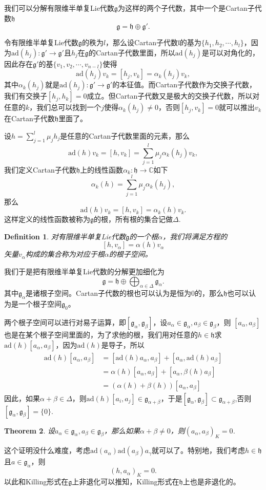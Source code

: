 \documentclass[8pt]{book}
\theoremstyle{plain}
\newtheorem{defi}{Definition}
\newtheorem{theo}[defi]{Theorem}
\newcommand{\cc}{\mathbb{C}}
\newcommand{\lag}{{\mathfrak{g}}}  %
\newcommand{\ad}{{\mathrm{ad}}}
\begin{document}
我们可以分解有限维半单复Lie代数$\lag$为这样的两个子代数，其中一个是Cartan子代数$\mathfrak{h}$
\[
	\lag=\mathfrak{h}\oplus \lag'.
\]

令有限维半单复Lie代数$\lag$的秩为$l$，那么设Cartan子代数$\mathfrak{l}$的基为$\{h_1,h_2,\cdots,h_l\}$，因为$\ad(h_j):\lag'\to \lag'$且$h_j$在$\lag$的Cartan子代数里面，所以$\ad(h_j)$是可以对角化的，因此存在$\lag'$的基$\{v_1,v_2,\cdots,v_{n-l}\}$使得
\[
	\ad(h_j)v_k=[h_j,v_k]=\alpha_{k}(h_j)v_k,
\]
其中$\alpha_{k}(h_j)$就是$\ad(h_j):\lag'\to \lag'$的本征值。而Cartan子代数作为交换子代数，我们有交换子$[h_j,h_k]=0$成立。但Cartan子代数又是极大的交换子代数，所以对任意的$k$，我们总可以找到一个$j$使得$\alpha_{k}(h_j)\neq 0$，否则$[h_j,v_k]=0$就可以推出$v_k$在Cartan子代数$\mathfrak{h}$里面了。

设$h=\sum_{j=1}^l\mu_jh_j$是任意的Cartan子代数里面的元素，那么
\[
	\ad(h)v_k=[h,v_k]=\sum_{j=1}^l\mu_j\alpha_{k}(h_j)v_k,
\]
我们定义Cartan子代数$\mathfrak{h}$上的线性函数$\alpha_{k}:\mathfrak{h}\to\cc$如下
\[
\alpha_{k}(h)=\sum_{j=1}^l\mu_j\alpha_{k}(h_j),
\]
那么
\[
	\ad(h)v_k=[h,v_k]=\alpha_{k}(h)v_k.
\]
这样定义的线性函数被称为$\lag$的根，所有根的集合记做$\Delta$.
\begin{defi}
对有限维半单复Lie代数$\lag$的一个根$\alpha$，我们将满足方程的
\[
[h,v_\alpha]=\alpha(h)v_\alpha
\]
矢量$v_\alpha$构成的集合称为对应于根$\alpha$的根子空间。
\end{defi}
我们于是把有限维半单复Lie代数的分解更加细化为
\[
	\lag=\mathfrak{h}\oplus \bigoplus_{\alpha\in\Delta} \lag_\alpha.
\]
其中$\lag_\alpha$是诸根子空间。Cartan子代数的根也可以认为是恒为0的，那么$\mathfrak{h}$也可以认为是一个根子空间$\lag_0$。

两个根子空间可以进行对易子运算，即$[\lag_\alpha,\lag_\beta]$，设$a_\alpha\in\lag_\alpha,a_\beta\in\lag_\beta$，则
$[a_\alpha,a_\beta]$也是在某个根子空间里面的，为了求他的根，我们用对任意的$h\in \mathfrak{h}$求$\ad(h)[a_\alpha,a_\beta]$，因为$\ad(h)$是导子，所以
\[
	\begin{split}
		\ad(h)[a_\alpha,a_\beta]&=[\ad(h)a_\alpha,a_\beta]+[a_\alpha,\ad(h)a_\beta]\\
		&=\alpha(h)[a_\alpha,a_\beta]+[a_\alpha,\beta(h)a_\beta]\\
		&=(\alpha(h)+\beta(h))[a_\alpha,a_\beta]
	\end{split}
\]
因此，如果$\alpha+\beta\in\Delta$，则$\ad(h)[a_i,a_j]\in \lag_{\alpha+\beta}$，于是$[\lag_\alpha,\lag_\beta]\subset \lag_{\alpha+\beta}$,否则$[\lag_\alpha,\lag_\beta]=\{0\}$.

\begin{theo}
设$a_\alpha\in\lag_\alpha,a_\beta\in\lag_\beta$，那么如果$\alpha+\beta\neq 0$，则$(a_\alpha,a_\beta)_K=0$.
\end{theo}
这个证明没什么难度，考虑$\ad(a_\alpha) \ad(a_\beta) a_\gamma$就可以了。特别地，我们考虑$h\in \mathfrak{h}$且$a\in \lag_\alpha$，则
\[
	(h,a_\alpha)_K=0.
\]
以此和Killing形式在$\mathfrak{g}$上非退化可以推知，Killing形式在$\mathfrak{h}$上也是非退化的。
\end{document}
